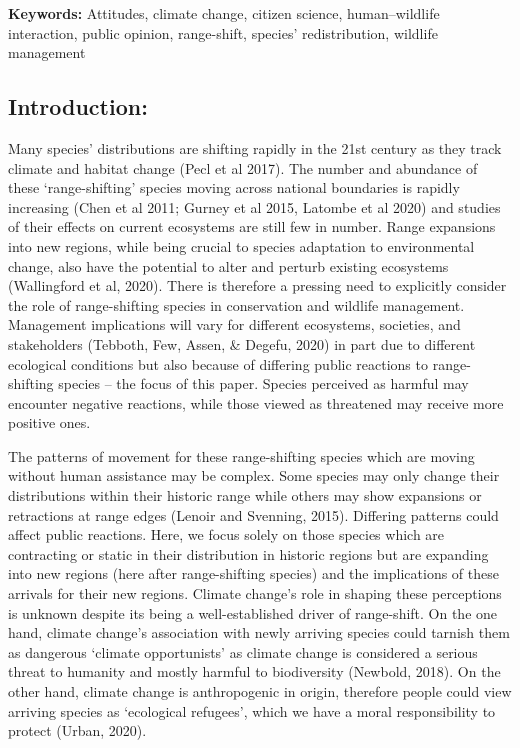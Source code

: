 \documentclass[
]{article}
\begin{document}
\textbf{Keywords:} Attitudes, climate change, citizen science,
human--wildlife interaction, public opinion, range-shift, species'
redistribution, wildlife management

\hypertarget{introduction}{%
\subsection{Introduction:}\label{introduction}}

Many species' distributions are shifting rapidly in the 21st century as
they track climate and habitat change (Pecl et al 2017). The number and
abundance of these `range-shifting' species moving across national
boundaries is rapidly increasing (Chen et al 2011; Gurney et al 2015,
Latombe et al 2020) and studies of their effects on current ecosystems
are still few in number. Range expansions into new regions, while being
crucial to species adaptation to environmental change, also have the
potential to alter and perturb existing ecosystems (Wallingford et al,
2020). There is therefore a pressing need to explicitly consider the
role of range-shifting species in conservation and wildlife management.
Management implications will vary for different ecosystems, societies,
and stakeholders (Tebboth, Few, Assen, \& Degefu, 2020) in part due to
different ecological conditions but also because of differing public
reactions to range-shifting species -- the focus of this paper. Species
perceived as harmful may encounter negative reactions, while those
viewed as threatened may receive more positive ones.

The patterns of movement for these range-shifting species which are
moving without human assistance may be complex. Some species may only
change their distributions within their historic range while others may
show expansions or retractions at range edges (Lenoir and Svenning,
2015). Differing patterns could affect public reactions. Here, we focus
solely on those species which are contracting or static in their
distribution in historic regions but are expanding into new regions
(here after range-shifting species) and the implications of these
arrivals for their new regions. Climate change's role in shaping these
perceptions is unknown despite its being a well-established driver of
range-shift. On the one hand, climate change's association with newly
arriving species could tarnish them as dangerous `climate opportunists'
as climate change is considered a serious threat to humanity and mostly
harmful to biodiversity (Newbold, 2018). On the other hand, climate
change is anthropogenic in origin, therefore people could view arriving
species as `ecological refugees', which we have a moral responsibility
to protect (Urban, 2020).
\end{document}
